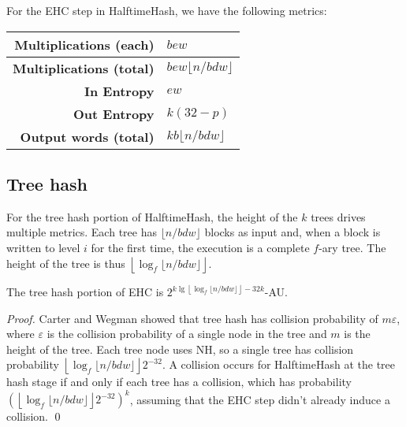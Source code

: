 \documentclass[runningheads]{llncs}
\begin{document}
For the EHC step in HalftimeHash, we have the following metrics:

\begin{tabular}{|r|l|}
    \hline {\bf Multiplications (each)} & $b e w$ \\
    \hline {\bf Multiplications (total)} & $b e w \lfloor n / b d w\rfloor$ \\
    \hline {\bf In Entropy} & $e w$ \\
    \hline {\bf Out Entropy} & $k (32-p)$\\
    \hline {\bf Output words (total)} & $k b \lfloor n / b d w\rfloor $\\
    \hline
\end{tabular}


\subsection{Tree hash}

For the tree hash portion of HalftimeHash, the height of the $k$ trees drives multiple metrics.
Each tree has $\lfloor n / b d w \rfloor$ blocks as input and, when a block is written to level $i$ for the first time, the execution is a complete $f$-ary tree.
The height of the tree is thus $\left\lfloor \log_f \lfloor n / b d w \rfloor \right\rfloor$.

\begin{lemma}
The tree hash portion of EHC is $2^{ k\lg\left\lfloor\log_f \lfloor n/b d w\rfloor\right\rfloor - 32k}$-AU.
\end{lemma}
\begin{proof}
  Carter and Wegman showed that tree hash has collision probability of $m \varepsilon$, where $\varepsilon$ is the collision probability of a single node in the tree and $m$ is the height of the tree.
  Each tree node uses NH, so a single tree has collision probability $\left\lfloor \log_f \lfloor n / b d w \rfloor \right\rfloor 2^{-32}$.
  A collision occurs for HalftimeHash at the tree hash stage if and only if each tree has a collision, which has probability $\left(\left\lfloor \log_f \lfloor n / b d w \rfloor \right\rfloor 2^{-32}\right)^k$, assuming that the EHC step didn't already induce a collision. \qed
\end{proof}
\end{document}
